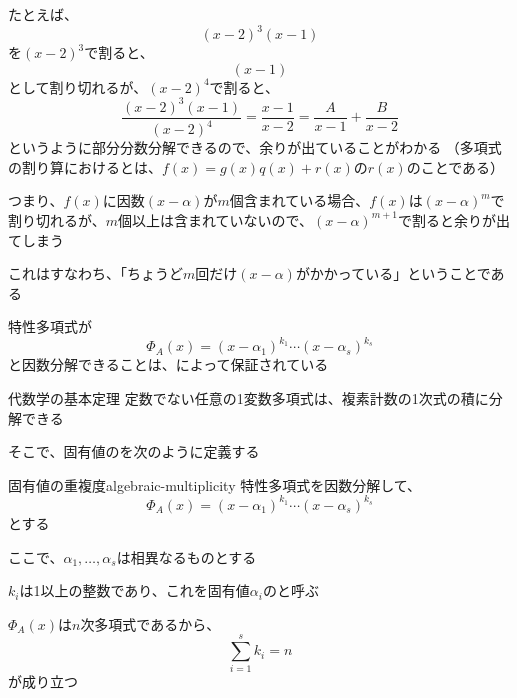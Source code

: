 \documentclass[../../../topic_linear-algebra]{subfiles}
\begin{document}
\br

たとえば、
\begin{equation*}
  (x-2)^3 (x-1)
\end{equation*}
を$(x-2)^3$で割ると、
\begin{equation*}
  (x - 1)
\end{equation*}
として割り切れるが、$(x-2)^4$で割ると、
\begin{equation*}
  \frac{(x-2)^3 (x-1)}{(x-2)^4} = \frac{x-1}{x-2} = \frac{A}{x-1} + \frac{B}{x-2}
\end{equation*}
というように部分分数分解できるので、余りが出ていることがわかる
（多項式の割り算におけるとは、$f(x) = g(x)q(x) + r(x)$の$r(x)$のことである）

\br

つまり、$f(x)$に因数$(x-\alpha)$が$m$個含まれている場合、$f(x)$は$(x-\alpha)^m$で割り切れるが、$m$個以上は含まれていないので、$(x-\alpha)^{m+1}$で割ると余りが出てしまう

これはすなわち、「ちょうど$m$回だけ$(x-\alpha)$がかかっている」ということである

\sectionline

特性多項式が
\begin{equation*}
  \Phi_A(x) = (x- \alpha_1)^{k_1}\cdots (x - \alpha_s)^{k_s}
\end{equation*}
と因数分解できることは、によって保証されている

\begin{theorem*}{代数学の基本定理}
  定数でない任意の1変数多項式は、複素計数の1次式の積に分解できる
\end{theorem*}

そこで、固有値のを次のように定義する

\begin{definition}{固有値の重複度}{algebraic-multiplicity}
  特性多項式を因数分解して、
  \begin{equation*}
    \Phi_A(x) = (x- \alpha_1)^{k_1}\cdots (x - \alpha_s)^{k_s}
  \end{equation*}
  とする

  ここで、$\alpha_1,\ldots, \alpha_s$は相異なるものとする

  $k_i$は1以上の整数であり、これを固有値$\alpha_i$のと呼ぶ

  $\Phi_A(x)$は$n$次多項式であるから、
  \begin{equation*}
    \sum_{i=1}^s k_i = n
  \end{equation*}
  が成り立つ
\end{definition}
\end{document}

